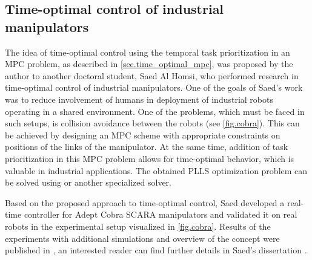 %
\begin{figure}[!htb]
\end{figure}
%


\subsection{Time-optimal control of industrial manipulators}\label{sec.time_opt}

The idea of time-optimal control using the temporal task prioritization in an
\acs{MPC} problem, as described in \cref{sec.time_optimal_mpc}, was proposed by
the author to another doctoral student, Saed Al Homsi, who performed research
in time-optimal control of industrial manipulators. One of the goals of Saed's
work was to reduce involvement of humans in deployment of industrial robots
operating in a shared environment. One of the problems, which must be faced in
such setups, is collision avoidance between the robots (see \cref{fig.cobra}).
This can be achieved by designing an \ac{MPC} scheme with appropriate
constraints on positions of the links of the manipulator. At the same time,
addition of task prioritization in this \ac{MPC} problem allows for
time-optimal behavior, which is valuable in industrial applications. The
obtained \ac{PLLS} optimization problem can be solved using  or
another specialized solver.

Based on the proposed approach to time-optimal control, Saed developed a
real-time controller for Adept Cobra \acs{SCARA} manipulators \cite{ADEPTsite}
and validated it on real robots in the experimental setup visualized in
\cref{fig.cobra}. Results of the experiments with additional simulations and
overview of the concept were published in \cite{alHomsi2016icra}, an interested
reader can find further details in Saed's dissertation
\cite{alHomsi2016thesis}.


